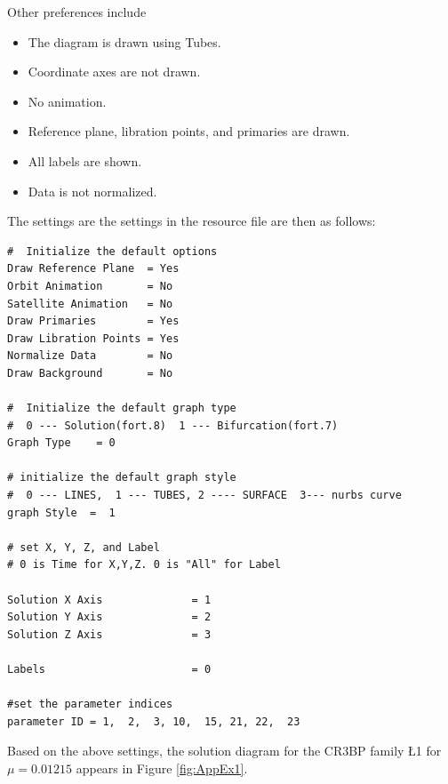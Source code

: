 Other preferences include
\begin{itemize}
\item The diagram is drawn using Tubes.
\item Coordinate axes are not drawn.
\item No animation.
\item Reference plane, libration points, and primaries are drawn.
\item All labels are shown.
\item Data is not normalized. 
\end{itemize}

The settings are the settings in the resource file are then as follows:
{\footnotesize
\begin{verbatim}
#  Initialize the default options
Draw Reference Plane  = Yes
Orbit Animation       = No
Satellite Animation   = No 
Draw Primaries        = Yes
Draw Libration Points = Yes
Normalize Data        = No
Draw Background       = No

#  Initialize the default graph type
#  0 --- Solution(fort.8)  1 --- Bifurcation(fort.7)
Graph Type    = 0

# initialize the default graph style
#  0 --- LINES,  1 --- TUBES, 2 ---- SURFACE  3--- nurbs curve
graph Style  =  1

# set X, Y, Z, and Label
# 0 is Time for X,Y,Z. 0 is "All" for Label

Solution X Axis              = 1
Solution Y Axis              = 2
Solution Z Axis              = 3

Labels                       = 0

#set the parameter indices 
parameter ID = 1,  2,  3, 10,  15, 21, 22,  23
\end{verbatim}
}

Based on the above settings, 
the solution diagram for the CR3BP family \L{1} for $\mu=0.01215$ appears in Figure \ref{fig:AppEx1}.

